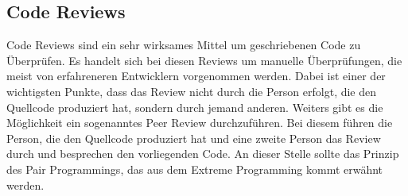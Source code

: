 \subsection{Code Reviews}
\SuperPar Code Reviews sind ein sehr wirksames Mittel um geschriebenen Code zu Überprüfen. Es handelt sich bei diesen Reviews um manuelle Überprüfungen, die meist von erfahreneren Entwicklern vorgenommen werden. Dabei ist einer der wichtigsten Punkte, dass das Review nicht durch die Person erfolgt, die den Quellcode produziert hat, sondern durch jemand anderen. Weiters gibt es die Möglichkeit ein sogenanntes Peer Review durchzuführen. Bei diesem führen die Person, die den Quellcode produziert hat und eine zweite Person das Review durch und besprechen den vorliegenden Code. An dieser Stelle sollte das Prinzip des Pair Programmings, das aus dem Extreme Programming kommt erwähnt werden. \cite{BeckExtreme} 